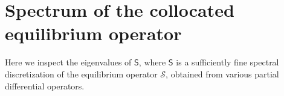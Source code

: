 \documentclass[final,onefignum,onetabnum]{siamart250211}
\newcommand{\mtx}[1]{\bm{\mathsf{#1}}}
\theoremstyle{definition}
\begin{document}

\clearpage
\section{Spectrum of the collocated equilibrium operator}\label{app:spectra}
Here we inspect the eigenvalues of $\mtx{S}$, where $\mtx{S}$ is a sufficiently fine spectral discretization of the equilibrium operator $\mathcal{S}$, obtained from various partial differential operators.
\end{document}
